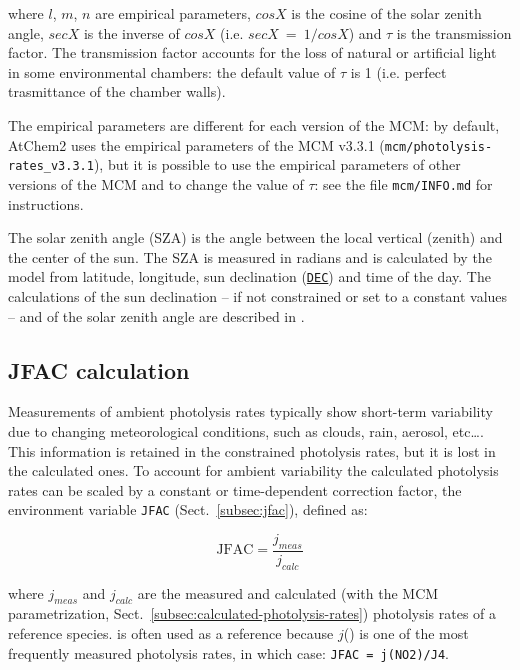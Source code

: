 where $l$, $m$, $n$ are empirical parameters, $cosX$ is the cosine of
the solar zenith angle, $secX$ is the inverse of $cosX$ (i.e.
$secX\ =\ 1/cosX$) and $\tau$ is the transmission factor. The
transmission factor accounts for the loss of natural or artificial
light in some environmental chambers: the default value of $\tau$ is 1
(i.e. perfect trasmittance of the chamber walls).

The empirical parameters are different for each version of the MCM: by
default, AtChem2 uses the empirical parameters of the MCM v3.3.1
(\texttt{mcm/photolysis-rates\_v3.3.1}), but it is possible to use the
empirical parameters of other versions of the MCM and to change the
value of $\tau$: see the file \texttt{mcm/INFO.md} for instructions.

The solar zenith angle (SZA) is the angle between the local vertical
(zenith) and the center of the sun. The SZA is measured in radians and
is calculated by the model from latitude, longitude, sun declination
(\hyperref[subsec:dec]{\texttt{DEC}}) and time of the day. The
calculations of the sun declination -- if not constrained or set to a
constant values -- and of the solar zenith angle are described in
\citet{madronich_1993}.

\subsection{JFAC calculation} \label{subsec:jfac-calculation}

Measurements of ambient photolysis rates typically show short-term
variability due to changing meteorological conditions, such as clouds,
rain, aerosol, etc\ldots \citep{sommariva_2020}. This information is
retained in the constrained photolysis rates, but it is lost in the
calculated ones. To account for ambient variability the calculated
photolysis rates can be scaled by a constant or time-dependent
correction factor, the environment variable \texttt{JFAC}
(Sect.~\ref{subsec:jfac}), defined as:

\begin{equation}
  \mathrm{JFAC} = \frac{j_{meas}}{j_{calc}}
\end{equation}

where $j_{meas}$ and $j_{calc}$ are the measured and calculated (with
the MCM parametrization, Sect.~\ref{subsec:calculated-photolysis-rates})
photolysis rates of a reference species.  is often used as a
reference because $j$() is one of the most frequently measured
photolysis rates, in which case: \verb|JFAC = j(NO2)/J4|.

